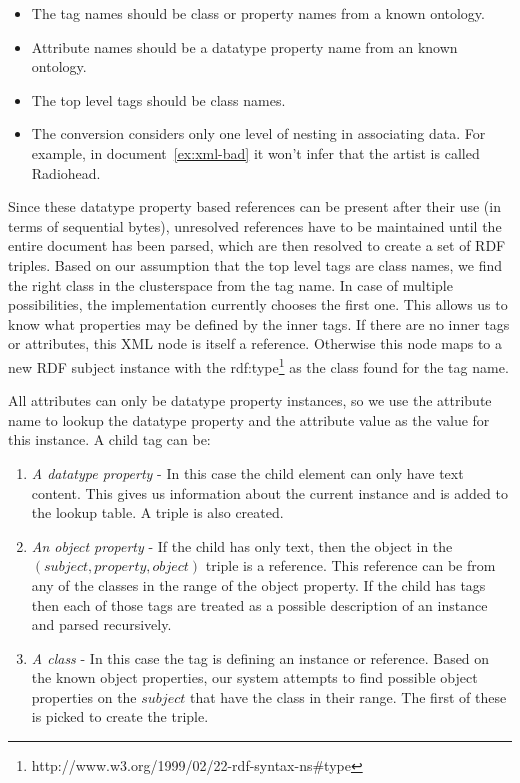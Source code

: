 \documentclass[journal]{IEEEtran}
\begin{document}
\begin{itemize}
    \item The tag names should be class or property names from a known ontology.
    \item Attribute names should be a datatype property name from an known
        ontology.
    \item The top level tags should be class names.
    \item The conversion considers only one level of nesting in associating
        data. For example, in document~\ref{ex:xml-bad} it won't infer that the
        artist is called Radiohead.
\end{itemize}

Since these datatype property based references can be present after their use
(in terms of sequential bytes), unresolved references have to be maintained
until the entire document has been parsed, which are then resolved to create
a set of RDF triples. Based on our assumption that the top level tags are class
names, we find the right class in the clusterspace from the tag name. In case
of multiple possibilities, the implementation currently chooses the first one.
This allows us to know what properties may be defined by the inner tags. If
there are no inner tags or attributes, this XML node is itself a reference.
Otherwise this node maps to a new RDF subject instance with the
rdf:type\footnote{http://www.w3.org/1999/02/22-rdf-syntax-ns\#type} as the
class found for the tag name.

All attributes can only be datatype property instances, so we use the attribute
name to lookup the datatype property and the attribute value as the value for
this instance. A child tag can be:
\begin{enumerate}
    \item \emph{A datatype property} - In this case the child element can only
        have text content. This gives us information about the current instance
        and is added to the lookup table. A triple is also created.
    \item \emph{An object property} - If the child has only text, then the
        object in the $(subject, property, object)$ triple is a reference. This
        reference can be from any of the classes in the range of the object
        property. If the child has tags then each of those tags are treated as
        a possible description of an instance and parsed recursively.
    \item \emph{A class} - In this case the tag is defining an instance or
        reference. Based on the known object properties, our system attempts to
        find possible object properties on the $subject$ that have the class in
        their range. The first of these is picked to create the triple.
\end{enumerate}
\end{document}
